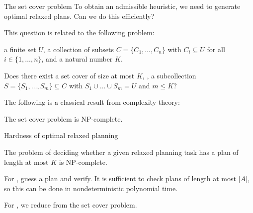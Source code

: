 \documentclass{gkibeamer}
\begin{document}
\begin{frame}{The set cover problem}
  To obtain an admissible heuristic, we need to generate optimal
  relaxed plans. Can we do this efficiently?

  \medskip

  This question is related to the following problem:
  \begin{problem}
     a finite set $U$, a collection of subsets
    $C = \{C_1, \dots, C_n\}$ with $C_i \subseteq U$ for all
    $i \in \{1, \dots, n\}$, and a natural number $K$.
    
    \smallskip

     Does there exist a set cover of size at most
    $K$, \ie, a subcollection $S = \{S_1, \dots, S_m\} \subseteq C$
    with $S_1 \cup \dots \cup S_m = U$ and $m \leq K$?
  \end{problem}
  
  \medskip

  The following is a classical result from complexity theory:
  \begin{theorem}[Karp 1972]
    The set cover problem is NP-complete.
  \end{theorem}
\end{frame}

\begin{frame}{Hardness of optimal relaxed planning}
  \begin{theorem}
    The problem of deciding whether a given relaxed planning task
    has a plan of length at most $K$ is NP-complete.
  \end{theorem}

  \begin{proofstart}
    For , guess a plan and verify.
    It is sufficient to check plans of length at most $|A|$, so this
    can be done in nondeterministic polynomial time.

    \medskip
    
    For , we reduce from the set cover problem.
  \end{proofstart}
\end{frame}
\end{document}
